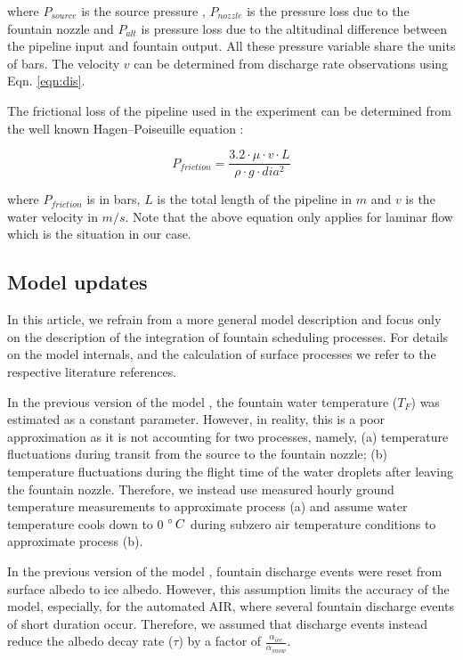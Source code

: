 \documentclass[tc, manuscript]{copernicus}
\begin{document}
where $P_{source}$ is the source pressure , $P_{nozzle}$ is the pressure loss due to the fountain nozzle and
$P_{alt}$ is pressure loss due to the altitudinal difference between the pipeline input and fountain output. All
these pressure variable share the units of bars.  The velocity $v$ can be determined from discharge rate
observations using Eqn. \ref{eqn:dis}. 

The frictional loss of the pipeline used in the experiment can be determined from the well known
Hagen–Poiseuille equation \cite{poiseuilleExperimentalInvestigationsFlow1847}:  

\begin{equation}
  \label{eqn:friction}
  P_{friction} = \frac{3.2 \cdot \mu \cdot v \cdot L}{\rho \cdot g \cdot dia^2}
\end{equation}

where $P_{friction}$ is in bars, $L$ is the total length of the pipeline in $m$ and $v$ is the water velocity in
$m/s$. Note that the above equation only applies for laminar flow which is the situation in our case.


\subsection{Model updates}

In this article, we refrain from a more general model description and focus only on the
description of the integration of fountain scheduling processes. For details on the model internals, and the
calculation of surface processes we refer to the respective literature references. 

In the previous version of the model \citep{balasubramanianInfluenceMeteorologicalConditions2022}, the fountain
water temperature ($T_F$) was estimated as a constant parameter. However, in reality, this is a poor
approximation as it is not accounting for two processes, namely, (a) temperature fluctuations during transit
from the source to the fountain nozzle; (b) temperature fluctuations during the flight time of the water
droplets after leaving the fountain nozzle. Therefore, we instead use measured hourly ground temperature
measurements to approximate process (a) and assume water temperature cools down to 0 $^{\circ}\,C$ during subzero
air temperature conditions to approximate process (b).

In the previous version of the model \citep{balasubramanianInfluenceMeteorologicalConditions2022}, fountain
discharge events were reset from surface albedo to ice albedo. However, this assumption limits the accuracy of
the model, especially, for the automated AIR, where several fountain discharge events of short duration occur.
Therefore, we assumed that discharge events instead reduce the albedo decay rate ($\tau$) by a 
factor of $\frac{\alpha_{ice}}{\alpha_{snow}}$.
\end{document}
